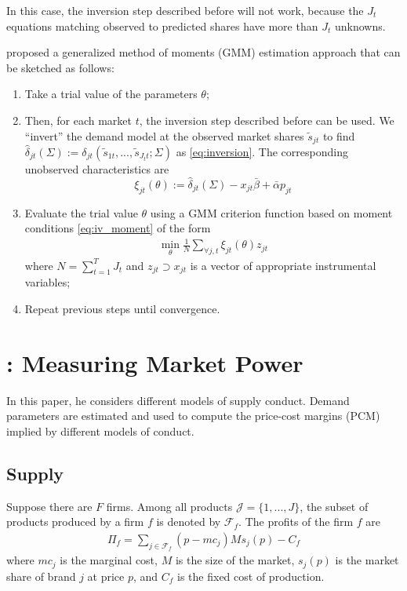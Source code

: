 \documentclass[11pt]{elegantbook}
\begin{document}
In this case, the inversion step described before will not work, because the $J_t$ equations matching observed to predicted shares have more than $J_t$ unknowns.

\cite{berry1995automobile} proposed a generalized method of moments (GMM) estimation approach that can be sketched as follows:
\begin{enumerate}
    \item Take a trial value of the parameters $\theta$;
    \item Then, for each market $t$, the inversion step described before can be used. We ``invert'' the demand model at the observed market shares $\tilde{s}_{jt}$ to find $\hat{\delta}_{jt}(\Sigma):=\delta_{jt}(\tilde{s}_{1t},...,\tilde{s}_{J_tt};\Sigma)$ as \eqref{eq:inversion}. The corresponding unobserved characteristics are $$\xi_{jt}(\theta):=\hat{\delta}_{jt}(\Sigma)-x_{jt}\bar{\beta}+\bar{\alpha}p_{jt}$$
    \item Evaluate the trial value $\theta$ using a GMM criterion function based on moment conditions \eqref{eq:iv_moment} of the form
    \begin{equation}
        \begin{aligned}
            \min_{\theta}\frac{1}{N}\sum_{\forall j,t}\xi_{jt}(\theta)z_{jt}
        \end{aligned}
        \nonumber
    \end{equation}
    where $N=\sum_{t=1}^T J_t$ and $z_{jt}\supset x_{jt}$ is a vector of  appropriate instrumental variables;
    \item Repeat previous steps until convergence.
\end{enumerate}

\section{\cite{nevo2001measuring}: Measuring Market Power}
In this paper, he considers different models of supply conduct.  Demand parameters are estimated and used to compute the price-cost margins (PCM) implied by different models of conduct.

\subsection{Supply}
Suppose there are $F$ firms. Among all products $\mathcal{J}=\{1,...,J\}$, the subset of products produced by a firm $f$ is denoted by $\mathcal{F}_f$. The profits of the firm $f$ are
\begin{equation}
    \begin{aligned}
        \Pi_f=\sum_{j\in \mathcal{F}_f}(p-mc_j)Ms_j(p)-C_f
    \end{aligned}
    \nonumber
\end{equation}
where $mc_j$ is the marginal cost, $M$ is the size of the market, $s_j(p)$ is the market share of brand $j$ at price $p$, and $C_f$ is the fixed cost of production.
\end{document}
